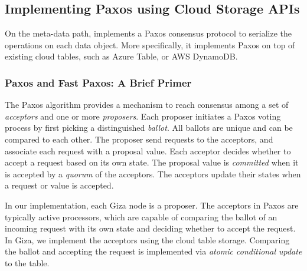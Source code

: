 
\subsection{Implementing Paxos using Cloud Storage APIs}

On the meta-data path, \name implements a Paxos consensus protocol to serialize the operations on each data object.
More specifically, it implements Paxos on top of existing cloud tables, such as Azure Table, or AWS DynamoDB.

\subsubsection{Paxos and Fast Paxos: A Brief Primer}

The Paxos algorithm provides a mechanism to reach consensus among a set of {\em acceptors} and one or more {\em proposers}. Each proposer initiates a Paxos voting process by first picking a distinguished {\em ballot}. All ballots are unique and can be compared to each other. The proposer send requests to the acceptors, and associate each request with a proposal value. Each acceptor decides whether to accept a request based on its own state. The proposal value is {\em committed} when it is accepted by a {\em quorum} of the acceptors. The acceptors update their states when a request or value is accepted.

In our implementation, each Giza node is a proposer. The acceptors in Paxos are typically active processors, which are capable of comparing the ballot of an incoming request with its own state and deciding whether to accept the request. In Giza, we implement the acceptors using the cloud table storage. Comparing the ballot and accepting the request is implemented via {\em atomic conditional update} to the table.

